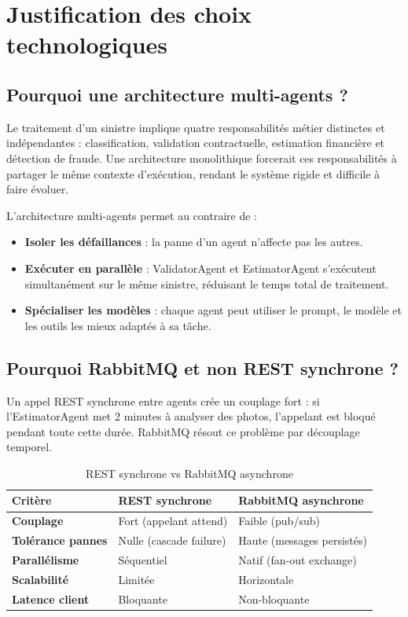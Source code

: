 \section{Justification des choix technologiques}

\subsection{Pourquoi une architecture multi-agents ?}

Le traitement d'un sinistre implique quatre responsabilités métier distinctes et
indépendantes : classification, validation contractuelle, estimation financière et
détection de fraude. Une architecture monolithique forcerait ces responsabilités
à partager le même contexte d'exécution, rendant le système rigide et difficile
à faire évoluer.

L'architecture multi-agents permet au contraire de :
\begin{itemize}
  \item \textbf{Isoler les défaillances} : la panne d'un agent n'affecte pas les autres.
  \item \textbf{Exécuter en parallèle} : ValidatorAgent et EstimatorAgent s'exécutent
        simultanément sur le même sinistre, réduisant le temps total de traitement.
  \item \textbf{Spécialiser les modèles} : chaque agent peut utiliser le prompt,
        le modèle et les outils les mieux adaptés à sa tâche.
\end{itemize}

\subsection{Pourquoi RabbitMQ et non REST synchrone ?}

Un appel REST synchrone entre agents crée un couplage fort : si l'EstimatorAgent
met 2 minutes à analyser des photos, l'appelant est bloqué pendant toute cette durée.
RabbitMQ résout ce problème par découplage temporel.

\begin{table}[H]
\centering
\caption{REST synchrone vs RabbitMQ asynchrone}
\begin{tabularx}{\textwidth}{>{\bfseries}lXX}
\toprule
Critère          & REST synchrone & RabbitMQ asynchrone \\
\midrule
Couplage         & Fort (appelant attend) & Faible (pub/sub) \\
Tolérance pannes & Nulle (cascade failure) & Haute (messages persistés) \\
Parallélisme     & Séquentiel & Natif (fan-out exchange) \\
Scalabilité      & Limitée & Horizontale \\
Latence client   & Bloquante & Non-bloquante \\
\bottomrule
\end{tabularx}
\label{tab:rest_vs_rabbit}
\end{table}

